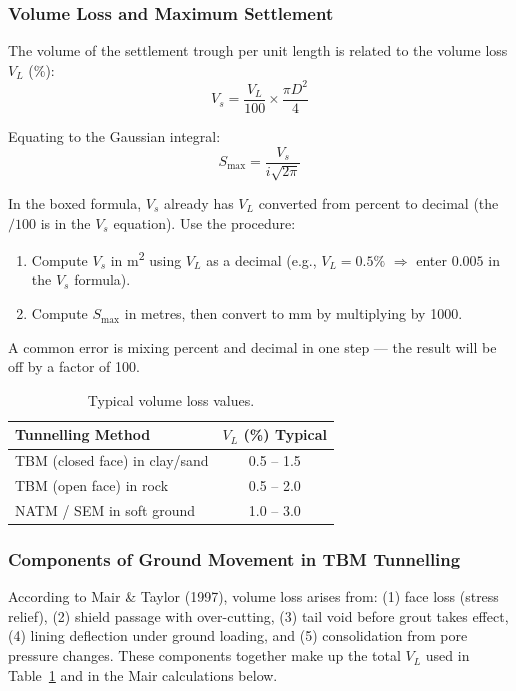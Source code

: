 \documentclass[a4paper,12pt]{article}
\begin{document}
\subsubsection{Volume Loss and Maximum Settlement}
The volume of the settlement trough per unit length is related to the volume loss $V_L$ (\%):
\[
V_s = \frac{V_L}{100} \times \frac{\pi D^2}{4}
\]

Equating to the Gaussian integral:
\[
\boxed{S_{\text{max}} = \frac{V_s}{i \sqrt{2\pi}}}
\]

\begin{warnbox}
In the boxed formula, $V_s$ already has $V_L$ converted from percent to decimal (the $/100$ is in the $V_s$ equation). Use the procedure:
\begin{enumerate}[nosep]
    \item Compute $V_s$ in m\textsuperscript{2} using $V_L$ as a decimal (e.g., $V_L = 0.5\%$ $\Rightarrow$ enter $0.005$ in the $V_s$ formula).
    \item Compute $S_{\text{max}}$ in metres, then convert to mm by multiplying by 1000.
\end{enumerate}
\vspace{0.5em}

A common error is mixing percent and decimal in one step --- the result will be off by a factor of 100.
\end{warnbox}

\begin{table}[h!]
\centering
\begin{tabular}{lc}
\toprule
\textbf{Tunnelling Method} & \textbf{$V_L$ (\%) Typical} \\
\midrule
TBM (closed face) in clay/sand & 0.5 -- 1.5 \\
TBM (open face) in rock & 0.5 -- 2.0 \\
NATM / SEM in soft ground & 1.0 -- 3.0 \\
\bottomrule
\end{tabular}
\caption{Typical volume loss values.}
\label{tab:vl_values}
\end{table}

\subsubsection{Components of Ground Movement in TBM Tunnelling}
According to Mair \& Taylor (1997), volume loss arises from: (1) face loss (stress relief), (2) shield passage with over-cutting, (3) tail void before grout takes effect, (4) lining deflection under ground loading, and (5) consolidation from pore pressure changes. These components together make up the total $V_L$ used in Table~\ref{tab:vl_values} and in the Mair calculations below.
\end{document}
